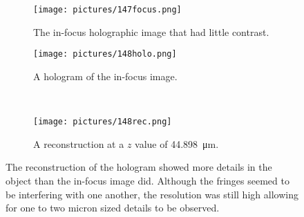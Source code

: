 
\begin{figure}[ht!]
    \begin{center}

        \begin{subfigure}[t]{0.4\textwidth}
            \label{fig:147focus}
            \texttt{[image: pictures/147focus.png]}
            \caption{The in-focus holographic image that had little contrast.}
        \end{subfigure}
        \hspace*{\fill}
        \begin{subfigure}[t]{0.4\textwidth}
            \label{fig:148holo}
            \texttt{[image: pictures/148holo.png]}
            \caption{A hologram of the in-focus image.}
        \end{subfigure}
        \\
        \begin{subfigure}[t]{\textwidth}
            \label{fig:148rec}
            \texttt{[image: pictures/148rec.png]}
            \caption{A reconstruction at a $z$ value of
                \SI{44.898}{\micro\meter}.}
        \end{subfigure}


    \end{center}
    \caption{%
        The reconstruction of the hologram showed more details in the object
        than the in-focus image did. Although the fringes seemed to be interfering with
        one another, the resolution was still high allowing for one to
        two micron sized details to be observed.
    }%
    \label{fig:148}
\end{figure}
\clearpage


